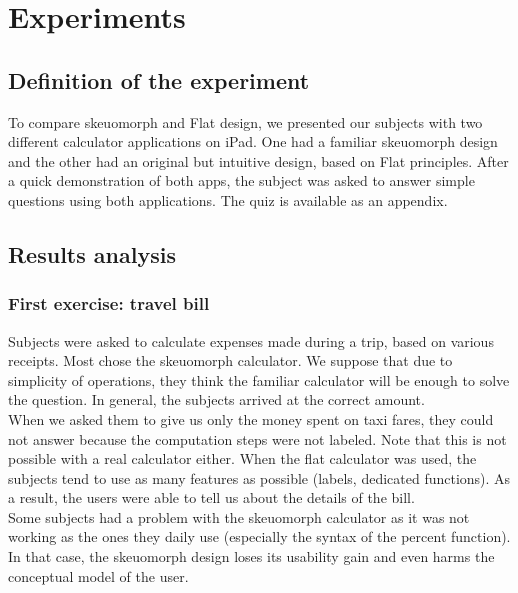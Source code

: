 \documentclass[a4paper,11pt] {article}
\theoremstyle{definition}
\begin{document}
\section{Experiments}
\label{sct:experiment}

    \subsection{Definition of the experiment}

    To compare skeuomorph and Flat design, we presented our subjects with two different calculator applications on iPad. One had a familiar skeuomorph design and the other had an original but intuitive design, based on Flat principles. After a quick demonstration of both apps, the subject was asked to answer simple questions using both applications. The quiz is available as an appendix.\\


    \subsection{Results analysis}

    \subsubsection{First exercise: travel bill}

    Subjects were asked to calculate expenses made during a trip, based on various receipts. Most chose the skeuomorph calculator. We suppose that due to simplicity of operations, they think the familiar calculator will be enough to solve the question. In general, the subjects arrived at the correct amount.\\

    When we asked them to give us only the money spent on taxi fares, they could not answer because the computation steps were not labeled. Note that this is not possible with a real calculator either. When the flat calculator was used, the subjects tend to use as many features as possible (labels, dedicated functions). As a result, the users were able to tell us about the details of the bill.\\

    Some subjects had a problem with the skeuomorph calculator as it was not working as the ones  they daily use (especially the syntax of the percent function). In that case, the skeuomorph design loses its usability gain and even harms the conceptual model of the user.\\
\end{document}
